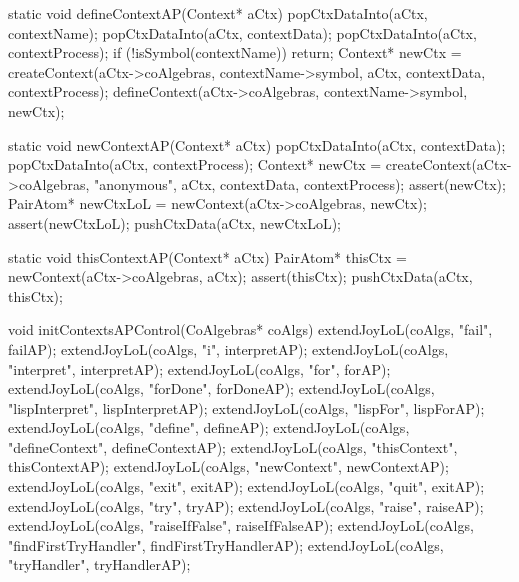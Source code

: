 static void defineContextAP(Context* aCtx) {
  popCtxDataInto(aCtx, contextName);
  popCtxDataInto(aCtx, contextData);
  popCtxDataInto(aCtx, contextProcess);
  if (!isSymbol(contextName)) return;
  Context* newCtx =
    createContext(aCtx->coAlgebras, contextName->symbol,
                  aCtx, contextData, contextProcess);
  defineContext(aCtx->coAlgebras, contextName->symbol, newCtx);
}

static void newContextAP(Context* aCtx) {
  popCtxDataInto(aCtx, contextData);
  popCtxDataInto(aCtx, contextProcess);
  Context* newCtx =
    createContext(aCtx->coAlgebras, "anonymous",
                  aCtx, contextData, contextProcess);
  assert(newCtx);
  PairAtom* newCtxLoL = newContext(aCtx->coAlgebras, newCtx);
  assert(newCtxLoL);
  pushCtxData(aCtx, newCtxLoL);
}

static void thisContextAP(Context* aCtx) {
  PairAtom* thisCtx = newContext(aCtx->coAlgebras, aCtx);
  assert(thisCtx);
  pushCtxData(aCtx, thisCtx);
}

void initContextsAPControl(CoAlgebras* coAlgs) {
  extendJoyLoL(coAlgs, "fail",                failAP);
  extendJoyLoL(coAlgs, "i",                   interpretAP);
  extendJoyLoL(coAlgs, "interpret",           interpretAP);
  extendJoyLoL(coAlgs, "for",                 forAP);
  extendJoyLoL(coAlgs, "forDone",             forDoneAP);
  extendJoyLoL(coAlgs, "lispInterpret",       lispInterpretAP);
  extendJoyLoL(coAlgs, "lispFor",             lispForAP);
  extendJoyLoL(coAlgs, "define",              defineAP);
  extendJoyLoL(coAlgs, "defineContext",       defineContextAP);
  extendJoyLoL(coAlgs, "thisContext",         thisContextAP);
  extendJoyLoL(coAlgs, "newContext",          newContextAP);
  extendJoyLoL(coAlgs, "exit",                exitAP);
  extendJoyLoL(coAlgs, "quit",                exitAP);
  extendJoyLoL(coAlgs, "try",                 tryAP);
  extendJoyLoL(coAlgs, "raise",               raiseAP);
  extendJoyLoL(coAlgs, "raiseIfFalse",        raiseIfFalseAP);
  extendJoyLoL(coAlgs, "findFirstTryHandler", findFirstTryHandlerAP);
  extendJoyLoL(coAlgs, "tryHandler",          tryHandlerAP);
}
\stoptyping